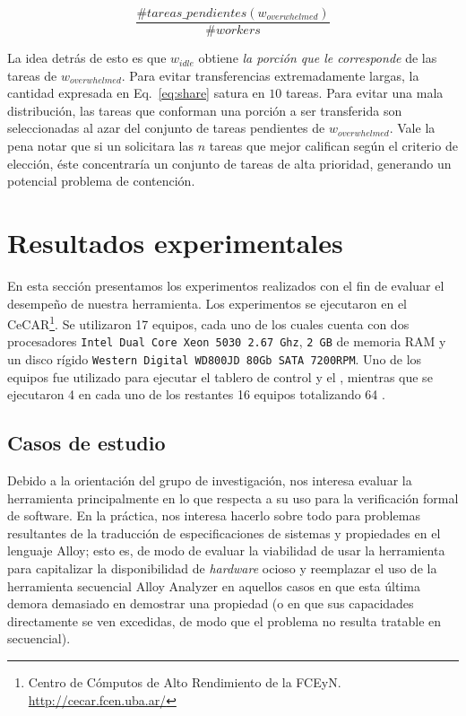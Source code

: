 \begin{equation}
\frac{\#tareas\_pendientes(w_{overwhelmed})}{\# workers}
\label{eq:share}
\end{equation} 

La idea detrás de esto es que $w_{idle}$
obtiene \emph{la porción que le corresponde} de las tareas de
$w_{overwhelmed}$. Para evitar transferencias extremadamente largas, la
cantidad expresada en Eq.~\ref{eq:share} satura en $10$ tareas. Para evitar
una mala distribución, las tareas que conforman una porción a ser transferida
son seleccionadas al azar del conjunto de tareas pendientes de
$w_{overwhelmed}$. Vale la pena notar que si un \w solicitara las $n$ tareas que mejor califican según el criterio de elección, éste concentraría un conjunto de tareas de alta prioridad, generando un potencial problema de contención.

\section{Resultados experimentales}

En esta sección presentamos los experimentos realizados con el fin de evaluar
el desempeño de nuestra herramienta.  Los experimentos se ejecutaron en el
\cluster CeCAR\footnote{Centro de C\'omputos de Alto Rendimiento de la FCEyN. \url{http://cecar.fcen.uba.ar/}}.
Se utilizaron 17 equipos,
cada uno de los cuales cuenta con dos procesadores \texttt{Intel Dual Core Xeon
5030 2.67 Ghz}, \texttt{2 GB} de memoria RAM y un disco rígido \texttt{Western
Digital WD800JD 80Gb SATA 7200RPM}. Uno de los equipos fue utilizado para
ejecutar el tablero de control y el \master, mientras que se ejecutaron 4 \ws
en cada uno de los restantes 16 equipos totalizando 64 \ws.


\subsection{Casos de estudio}

Debido a la orientación del grupo de investigación, nos interesa evaluar la herramienta principalmente en lo que respecta a su uso para la verificación formal de software. En la práctica, nos interesa hacerlo sobre todo para problemas resultantes de la traducción de especificaciones de sistemas y propiedades en el lenguaje Alloy; esto es, de modo de evaluar la viabilidad de usar la herramienta para capitalizar la disponibilidad de \emph{hardware} ocioso y reemplazar el uso de la herramienta secuencial Alloy Analyzer en aquellos casos en que esta última demora demasiado en demostrar una propiedad (o en que sus capacidades directamente se ven excedidas, de modo que el problema no resulta tratable en secuencial).

